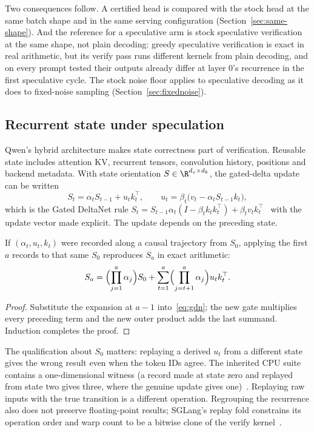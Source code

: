 Two consequences follow. A certified head is compared with the stock head at the same batch shape and in the same serving configuration (Section~\ref{sec:same-shape}). And the reference for a speculative arm is stock speculative verification at the same shape, not plain decoding: greedy speculative verification is exact in real arithmetic, but its verify pass runs different kernels from plain decoding, and on every prompt tested their outputs already differ at layer 0's recurrence in the first speculative cycle. The stock noise floor applies to speculative decoding as it does to fixed-noise sampling (Section~\ref{sec:fixednoise}).

\subsection{Recurrent state under speculation}\label{sec:exactness-state}
Qwen's hybrid architecture makes state correctness part of verification. Reusable state includes attention KV, recurrent tensors, convolution history, positions and backend metadata. With state orientation $S\in\R^{d_v\times d_k}$, the gated-delta update can be written
\begin{equation}
S_t=\alpha_tS_{t-1}+u_tk_t^\top,\qquad u_t=\beta_t\bigl(v_t-\alpha_tS_{t-1}k_t\bigr),\label{eq:gdn}
\end{equation}
which is the Gated DeltaNet rule $S_t=S_{t-1}\alpha_t(I-\beta_tk_tk_t^\top)+\beta_tv_tk_t^\top$~\cite{gdn} with the update vector made explicit. The update depends on the preceding state.

\begin{proposition}\label{prop:gdn}
If $(\alpha_t,u_t,k_t)$ were recorded along a causal trajectory from $S_0$, applying the first $a$ records to that same $S_0$ reproduces $S_a$ in exact arithmetic:
\[S_a=\Bigl(\prod_{j=1}^{a}\alpha_j\Bigr)S_0+\sum_{t=1}^{a}\Bigl(\prod_{j=t+1}^{a}\alpha_j\Bigr)u_tk_t^\top.\]
\end{proposition}
\begin{proof}
Substitute the expansion at $a-1$ into~\eqref{eq:gdn}; the new gate multiplies every preceding term and the new outer product adds the last summand. Induction completes the proof.
\end{proof}
The qualification about $S_0$ matters: replaying a derived $u_t$ from a different state gives the wrong result even when the token IDs agree. The inherited CPU suite contains a one-dimensional witness (a record made at state zero and replayed from state two gives three, where the genuine update gives one)~. Replaying raw inputs with the true transition is a different operation. Regrouping the recurrence also does not preserve floating-point results; SGLang's replay fold constrains its operation order and warp count to be a bitwise clone of the verify kernel~\cite{gdncode}.

